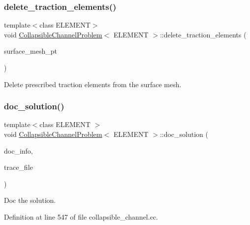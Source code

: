 \subsubsection{\texorpdfstring{delete\+\_\+traction\+\_\+elements()}{delete\_traction\_elements()}\hspace{0.1cm}{\footnotesize\ttfamily [2/2]}}
{\footnotesize\ttfamily template$<$class E\+L\+E\+M\+E\+NT$>$ \\
void \hyperlink{classCollapsibleChannelProblem}{Collapsible\+Channel\+Problem}$<$ E\+L\+E\+M\+E\+NT $>$\+::delete\+\_\+traction\+\_\+elements (\begin{DoxyParamCaption}\item[{Mesh $\ast$const \&}]{surface\+\_\+mesh\+\_\+pt }\end{DoxyParamCaption})\hspace{0.3cm}{\ttfamily [private]}}



Delete prescribed traction elements from the surface mesh. 

\mbox{\label{classCollapsibleChannelProblem_afc4af9796c01d904d4074bd5bbfc5b9b}} 
\subsubsection{\texorpdfstring{doc\+\_\+solution()}{doc\_solution()}\hspace{0.1cm}{\footnotesize\ttfamily [1/2]}}
{\footnotesize\ttfamily template$<$class E\+L\+E\+M\+E\+NT $>$ \\
void \hyperlink{classCollapsibleChannelProblem}{Collapsible\+Channel\+Problem}$<$ E\+L\+E\+M\+E\+NT $>$\+::doc\+\_\+solution (\begin{DoxyParamCaption}\item[{Doc\+Info \&}]{doc\+\_\+info,  }\item[{ofstream \&}]{trace\+\_\+file }\end{DoxyParamCaption})}



Doc the solution. 



Definition at line 547 of file collapsible\+\_\+channel.\+cc.



